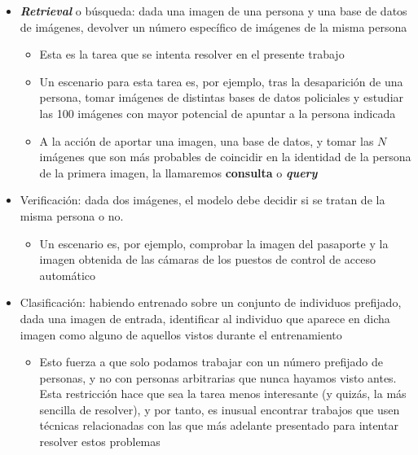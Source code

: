 \begin{itemize}
    \item \textbf{\textit{Retrieval}} o búsqueda: dada una imagen de una persona y una base de datos de imágenes, devolver un número específico de imágenes de la misma persona

        \begin{itemize}
            \item Esta es la tarea que se intenta resolver en el presente trabajo
            \item Un escenario para esta tarea es, por ejemplo, tras la desaparición de una persona, tomar imágenes de distintas bases de datos policiales y estudiar las 100 imágenes con mayor potencial de apuntar a la persona indicada
            \item A la acción de aportar una imagen, una base de datos, y tomar las $N$ imágenes que son más probables de coincidir en la identidad de la persona de la primera imagen, la llamaremos \textbf{consulta} o \textbf{\textit{query}}
        \end{itemize}

    \item Verificación: dada dos imágenes, el modelo debe decidir si se tratan de la misma persona o no.
        \begin{itemize}
            \item Un escenario es, por ejemplo, comprobar la imagen del pasaporte y la imagen obtenida de las cámaras de los puestos de control de acceso automático
        \end{itemize}

    \item Clasificación: habiendo entrenado sobre un conjunto de individuos prefijado, dada una imagen de entrada, identificar al individuo que aparece en dicha imagen como alguno de aquellos vistos durante el entrenamiento
        \begin{itemize}
            \item Esto fuerza a que solo podamos trabajar con un número prefijado de personas, y no con personas arbitrarias que nunca hayamos visto antes. Esta restricción hace que sea la tarea menos interesante (y quizás, la más sencilla de resolver), y por tanto, es inusual encontrar trabajos que usen técnicas relacionadas con las que más adelante presentado para intentar resolver estos problemas
        \end{itemize}
\end{itemize}

